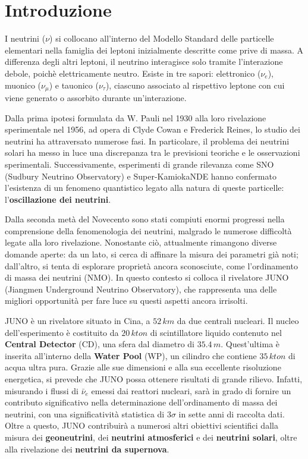 \chapter*{Introduzione}
I neutrini ($\nu$) si collocano all'interno del Modello Standard delle particelle elementari nella famiglia dei leptoni inizialmente descritte come prive di massa. A differenza degli altri leptoni, il neutrino interagisce solo tramite l'interazione debole, poichè elettricamente neutro. Esiste in tre sapori: elettronico ($\nu_e$), muonico ($\nu_\mu$) e tauonico ($\nu_\tau$), ciascuno associato al rispettivo leptone con cui viene generato o assorbito durante un'interazione.

Dalla prima ipotesi formulata da W. Pauli nel 1930 alla loro rivelazione sperimentale nel 1956, ad opera di Clyde Cowan e Frederick Reines, lo studio dei neutrini ha attraversato numerose fasi. In particolare, il problema dei neutrini solari ha messo in luce una discrepanza tra le previsioni teoriche e le osservazioni sperimentali. Successivamente, esperimenti di grande rilevanza come SNO (Sudbury Neutrino Observatory) e Super-KamiokaNDE hanno confermato l'esistenza di un fenomeno quantistico legato alla natura di queste particelle: l’\textbf{oscillazione dei neutrini}.

Dalla seconda metà del Novecento sono stati compiuti enormi progressi nella comprensione della fenomenologia dei neutrini, malgrado le numerose difficoltà legate alla loro rivelazione. Nonostante ciò, attualmente rimangono diverse domande aperte: da un lato, si cerca di affinare la misura dei parametri già noti; dall’altro, si tenta di esplorare proprietà ancora sconosciute, come l’ordinamento di massa dei neutrini (NMO). In questo contesto si colloca il rivelatore JUNO (Jiangmen Underground Neutrino Observatory), che rappresenta una delle migliori opportunità per fare luce su questi aspetti ancora irrisolti.

JUNO è un rivelatore situato in Cina, a $52\,\unit{km}$ da due centrali nucleari. Il nucleo dell'esperimento è costituito da $20\,\unit{kton}$ di scintillatore liquido contenuto nel \textbf{Central Detector} (CD), una sfera dal diametro di $35.4\,\unit{m}$. Quest'ultima è inserita all'interno della \textbf{Water Pool} (WP), un cilindro che contiene $35\,\unit{kton}$ di acqua ultra pura.   Grazie alle sue dimensioni e alla sua eccellente risoluzione energetica, si prevede che JUNO possa ottenere risultati di grande rilievo. Infatti, misurando i flussi di $\bar{\nu}_e$ emessi dai reattori nucleari, sarà in grado di fornire un contributo significativo nella determinazione dell’ordinamento di massa dei neutrini, con una significatività statistica di $3\sigma$ in sette anni di raccolta dati. Oltre a questo, JUNO contribuirà a numerosi altri obiettivi scientifici dalla misura dei \textbf{geoneutrini}, dei \textbf{neutrini atmosferici} e dei \textbf{neutrini solari}, oltre alla rivelazione dei \textbf{neutrini da supernova}.

